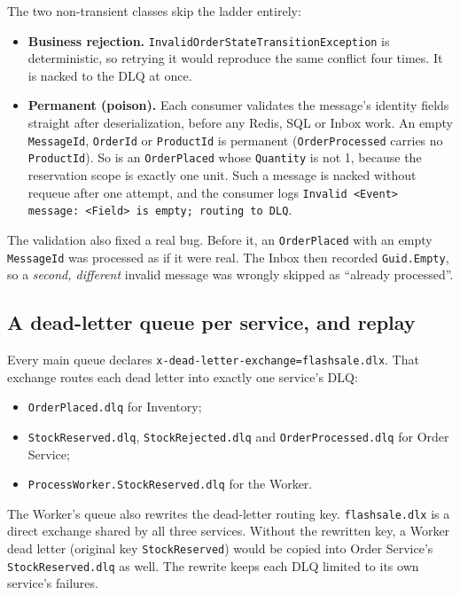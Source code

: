 \documentclass[a4paper]{report}
\begin{document}
The two non-transient classes skip the ladder entirely:
\begin{itemize}
  \item \textbf{Business rejection.} \texttt{InvalidOrderStateTransitionException}
    is deterministic, so retrying it would reproduce the same conflict four
    times. It is nacked to the DLQ at once.
  \item \textbf{Permanent (poison).} Each consumer validates the message's
    identity fields straight after deserialization, before any Redis, SQL or
    Inbox work. An empty \texttt{MessageId}, \texttt{OrderId} or
    \texttt{ProductId} is permanent (\texttt{OrderProcessed} carries no
    \texttt{ProductId}). So is an \texttt{OrderPlaced} whose
    \texttt{Quantity} is not 1, because the reservation scope is exactly one
    unit. Such a message is nacked without requeue after one attempt, and
    the consumer logs \texttt{Invalid <Event> message: <Field> is empty;
    routing to DLQ}.
\end{itemize}

The validation also fixed a real bug. Before it, an
\texttt{OrderPlaced} with an empty \texttt{MessageId} was processed as if it
were real. The Inbox then recorded \texttt{Guid.Empty}, so a
\emph{second, different} invalid message was wrongly skipped as ``already
processed''.

\subsection{A dead-letter queue per service, and replay}

Every main queue declares \texttt{x-dead-letter-exchange=flashsale.dlx}.
That exchange routes each dead letter into exactly one service's DLQ:
\begin{itemize}
  \item \texttt{OrderPlaced.dlq} for Inventory;
  \item \texttt{StockReserved.dlq}, \texttt{StockRejected.dlq} and
    \texttt{OrderProcessed.dlq} for Order Service;
  \item \texttt{ProcessWorker.StockReserved.dlq} for the Worker.
\end{itemize}
The Worker's queue also rewrites the dead-letter routing key.
\texttt{flashsale.dlx} is a direct exchange shared by all three services.
Without the rewritten key, a Worker dead letter (original key
\texttt{StockReserved}) would be copied into Order Service's
\texttt{StockReserved.dlq} as well. The rewrite keeps each DLQ limited to its
own service's failures.
\end{document}
